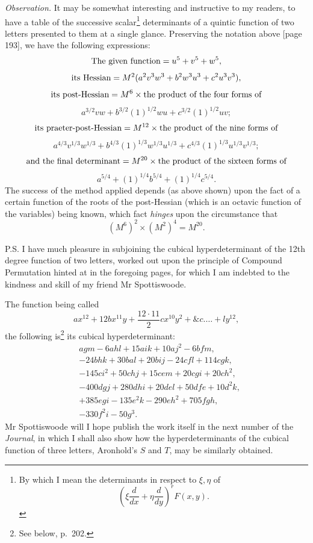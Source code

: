 \documentclass[11pt]{article}
\newcommand{\sourcepage}[1]{\marginpar{\scriptsize p.~#1}}
\begin{document}
{{\emph{Observation.} It may be somewhat interesting and instructive to my readers, to have a table of the successive scalar\footnote{By which I mean the determinants in respect to $\xi,\eta$ of
\[
 \left(\xi\frac{d}{dx}+\eta\frac{d}{dy}\right)^r F(x,y).
\]} determinants of a quintic function of two letters presented to them at a single glance. Preserving the notation above [page 193], we have the following expressions:
\[
 \hbox{The given function}=u^5+v^5+w^5,
\]
\[
 \hbox{its Hessian}=M^2(a^2v^3w^3+b^2w^3u^3+c^2u^3v^3),
\]
\[
 \hbox{its post-Hessian}=M^6\times\hbox{the product of the four forms of}
\]
\[
 a^{3/2}vw+b^{3/2}(1)^{1/2}wu+c^{3/2}(1)^{1/2}uv;
\]
\[
 \hbox{its praeter-post-Hessian}=M^{12}\times\hbox{the product of the nine forms of}
\]
\[
 a^{4/3}v^{1/3}w^{1/3}+b^{4/3}(1)^{1/3}w^{1/3}u^{1/3}
 +c^{4/3}(1)^{1/3}u^{1/3}v^{1/3};
\]
\[
 \hbox{and the final determinant}=M^{20}\times\hbox{the product of the sixteen forms of}
\]
\[
 a^{5/4}+(1)^{1/4}b^{5/4}+(1)^{1/4}c^{5/4}.
\]
The success of the method applied depends (as above shown) upon the fact of a certain function of the roots of the post-Hessian (which is an octavic function of the variables) being known, which fact \emph{hinges} upon the circumstance that
\[
 (M^6)^2\times(M^2)^4=M^{20}.
\]

P.S. I have much pleasure in subjoining the cubical hyperdeterminant of the 12th degree function of two letters, worked out upon the principle of Compound Permutation hinted at in the foregoing pages, for which I am indebted to the kindness and skill of my friend Mr Spottiswoode.

\sourcepage{197}
The function being called
\[
 ax^{12}+12bx^{11}y+\frac{12\cdot11}{2}cx^{10}y^2+\&c.\ldots+ly^{12},
\]
the following is\footnote{See below, p.~202.} its cubical hyperdeterminant:
\[
\begin{aligned}
&agm-6ahl+15aik+10aj^2-6bfm,\\
&-24bhk+30bal+20bij-24cfl+114cgk,\\
&-145ci^2+50chj+15cem+20cgi+20ch^2,\\
&-400dgj+280dhi+20del+50dfe+10d^2k,\\
&+385egi-135e^2k-290eh^2+705fgh,\\
&-330f^2i-50g^3.
\end{aligned}
\]
Mr Spottiswoode will I hope publish the work itself in the next number of the \emph{Journal}, in which I shall also show how the hyperdeterminants of the cubical function of three letters, Aronhold's $S$ and $T$, may be similarly obtained.

}}
\end{document}
